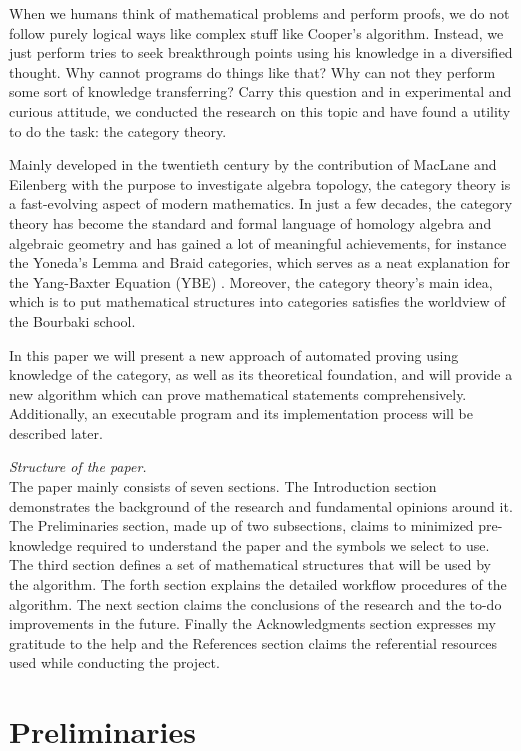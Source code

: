 \documentclass{aims}
\numberwithin{equation}{section}
\numberwithin{theorem}{section}	%
\numberwithin{axiom}{section}	%
\numberwithin{definition}{section}	%
\begin{document}
	When we humans think of mathematical problems and perform proofs, we do not follow purely logical ways like complex stuff like Cooper{'}s algorithm. Instead, we just perform tries to seek breakthrough points using his knowledge in a diversified thought. Why cannot programs do things like that? Why can not they perform some sort of knowledge transferring? Carry this question and in experimental and curious attitude, we conducted the research on this topic and have found a utility to do the task: the category theory.
	
	Mainly developed in the twentieth century by the contribution of MacLane and Eilenberg with the purpose to investigate algebra topology, the category theory is a fast-evolving aspect of modern mathematics. In just a few decades, the category theory has become the standard and formal language of homology algebra and algebraic geometry and has gained a lot of meaningful achievements, for instance the Yoneda{'}s Lemma and Braid categories, which serves as a neat explanation for the Yang-Baxter Equation (YBE) \cite{Li2019}. Moreover, the category theory{'}s main idea, which is to put mathematical structures into categories satisfies the worldview of the Bourbaki school.
	
	In this paper we will present a new approach of automated proving using knowledge of the category, as well as its theoretical foundation, and will provide a new algorithm which can prove mathematical statements comprehensively. Additionally, an executable program and its implementation process will be described later.
	
	\textit{ Structure of the paper.}\\
	The paper mainly consists of seven sections. The Introduction section demonstrates the background of the research and fundamental opinions around it. The Preliminaries section, made up of two subsections, claims to minimized pre-knowledge required to understand the paper and the symbols we select to use. The third section defines a set of mathematical structures that will be used by the algorithm. The forth section explains the detailed workflow procedures of the algorithm. The next section claims the conclusions of the research and the to-do improvements in the future. Finally the Acknowledgments section expresses my gratitude to the help and the References section claims the referential resources used while conducting the project.
	
	\section{Preliminaries}
	
\end{document}
